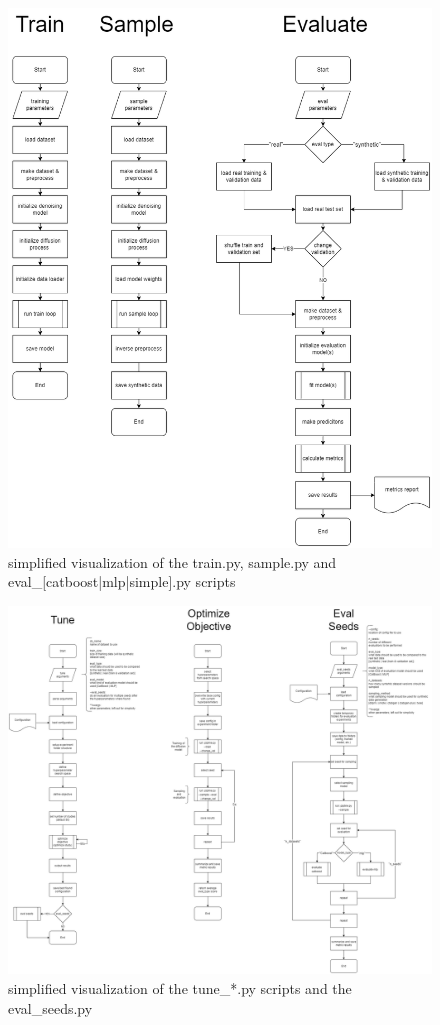 \begin{figure}
	\centering
	\includegraphics[width=\textwidth]{images/train-sample-eval.png}
	\caption{simplified visualization of the train.py, sample.py and eval\_[catboost|mlp|simple].py scripts}
	\label{fig:a_original_train_sample_eval}
\end{figure}
\begin{landscape}
\begin{figure}
	\centering
	\includegraphics[height=\textheight,width=\linewidth,keepaspectratio]{images/tune_eval_seeds-ORIGINAL.png}
	\caption{simplified visualization of the tune\_*.py scripts and the eval\_seeds.py}
\end{figure}
\end{landscape}

